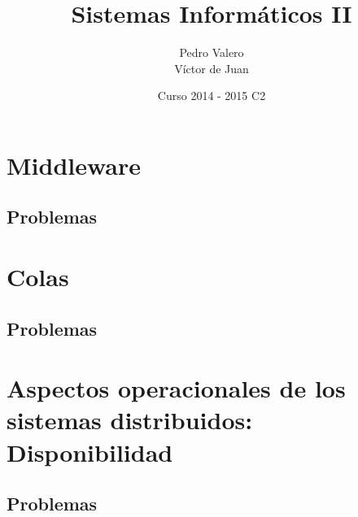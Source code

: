 \documentclass{apuntes}
\title{Sistemas Informáticos II}
\author{Pedro Valero \\ Víctor de Juan}
\date{Curso 2014 - 2015 C2}
\begin{document}
\newpage
\tableofcontents


\chapter{Middleware}


\newpage
\section{Problemas}
\newpage

\chapter{Colas}
\section{Problemas}



\chapter{Aspectos operacionales de los sistemas distribuidos: Disponibilidad}

\newpage
\section{Problemas}


\printindex
\end{document}
